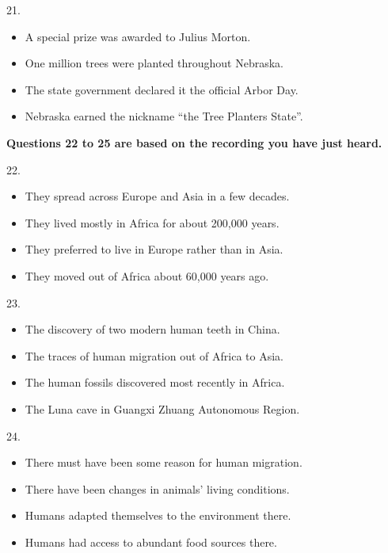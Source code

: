 \documentclass[UTF8,11pt]{ctexart}
\begin{document}
21.


\begin{itemize}[leftmargin=2em,itemsep=.2em,topsep=.4em]\item[A.] A special prize was awarded to Julius Morton.
\item[B.] One million trees were planted throughout Nebraska.
\item[C.] The state government declared it the official Arbor Day.
\item[D.] Nebraska earned the nickname “the Tree Planters State”.
\end{itemize}

\textbf{Questions 22 to 25 are based on the recording you have just heard.}


22.


\begin{itemize}[leftmargin=2em,itemsep=.2em,topsep=.4em]\item[A.] They spread across Europe and Asia in a few decades.
\item[B.] They lived mostly in Africa for about 200,000 years.
\item[C.] They preferred to live in Europe rather than in Asia.
\item[D.] They moved out of Africa about 60,000 years ago.
\end{itemize}

23.


\begin{itemize}[leftmargin=2em,itemsep=.2em,topsep=.4em]\item[A.] The discovery of two modern human teeth in China.
\item[B.] The traces of human migration out of Africa to Asia.
\item[C.] The human fossils discovered most recently in Africa.
\item[D.] The Luna cave in Guangxi Zhuang Autonomous Region.
\end{itemize}

24.


\begin{itemize}[leftmargin=2em,itemsep=.2em,topsep=.4em]\item[A.] There must have been some reason for human migration.
\item[B.] There have been changes in animals’ living conditions.
\item[C.] Humans adapted themselves to the environment there.
\item[D.] Humans had access to abundant food sources there.
\end{itemize}
\end{document}
